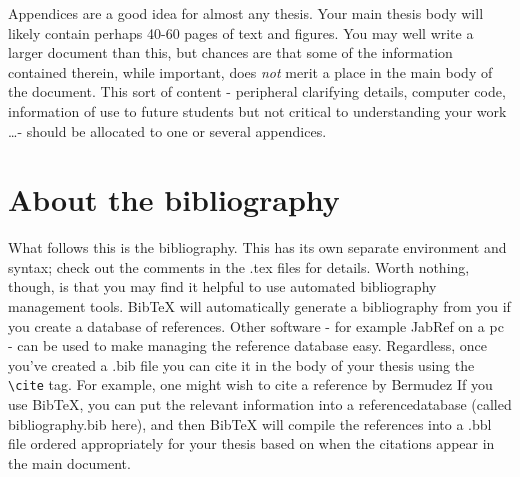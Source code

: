
Appendices are a good idea for almost any thesis.  Your main thesis body will likely contain perhaps 40-60 pages of text and figures.  You may well write a larger document than this, but chances are that some of the information contained therein, while important, does \emph{not} merit a place in the main body of the document.  This sort of content - peripheral clarifying details, computer code, information of use to future students but not critical to understanding your work \ldots - should be allocated to one or several appendices.  


\section{About the bibliography}
What follows this is the bibliography.  This has its own separate environment and syntax; check out the comments in the .tex files for details.  Worth nothing, though, is that you may find it helpful to use automated bibliography management tools.  BibTeX will automatically generate a bibliography from you if you create a database of references.  Other software - for example JabRef on a pc - can be used to make managing the reference database easy.  Regardless, once you've created a .bib file you can cite it in the body of your thesis using the \texttt{\textbackslash cite} tag.  For example, one might wish to cite a reference by Bermudez  If you use BibTeX, you can put the relevant information into a referencedatabase (called bibliography.bib here), and then BibTeX will compile the references into a .bbl file ordered appropriately for your thesis based on when the citations appear in the main document.